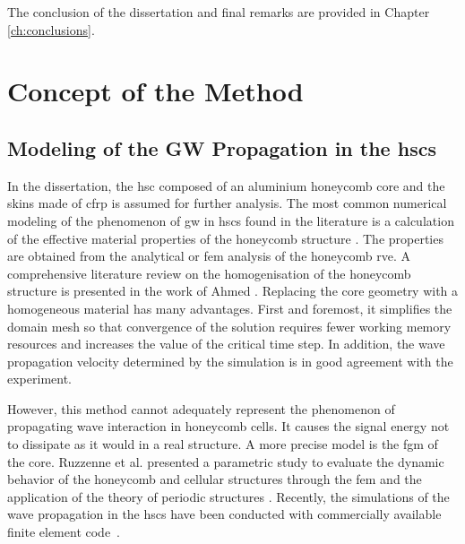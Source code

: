 \documentclass[11pt,a4paper,final]{report}
\begin{document}
The conclusion of the dissertation and final remarks are provided in Chapter \ref{ch:conclusions}.

\clearpage{}
\clearpage{}

\chapter[Concept of the Method]{Concept of the Method}
\label{ch:method}






\section{Modeling of the GW Propagation in the \acp{hsc}}
\label{sec:modelling}





In the dissertation, the \ac{hsc} composed of an aluminium honeycomb core and the skins made of \ac{cfrp} is assumed for further analysis.
The most common numerical modeling of the phenomenon of \ac{gw} in \acp{hsc} found in the literature is a calculation of the effective material properties of the honeycomb structure \cite{baid2015dispersion, mustapha2014leaky, qi2008ultrasonic,  shi1995derivation, sikdar2016guided}.
The properties are obtained from the analytical \cite{gibson1982mechanics, malek2015effective} or \ac{fem} \cite{catapano2014multi, chen2014analysis} analysis of the honeycomb \ac{rve}.
A comprehensive literature review on the homogenisation of the honeycomb structure is presented in the work of Ahmed \cite{ahmed2019homogenization}.
Replacing the core geometry with a homogeneous material has many advantages.
First and foremost, it simplifies the domain mesh so that convergence of the solution requires fewer working memory resources and increases the value of the critical time step.
In addition, the wave propagation velocity determined by the simulation is in good agreement with the experiment.

However, this method cannot adequately represent the phenomenon of propagating wave interaction in honeycomb cells.
It causes the signal energy not to dissipate as it would in a real structure.
A more precise model is the \ac{fgm} of the core. 
Ruzzenne et al. presented a parametric study to evaluate the dynamic behavior of the honeycomb and cellular structures through the \ac{fem} and the application of the theory of periodic structures \cite{ruzzene2003wave}.
Recently, the simulations of the wave propagation in the \acp{hsc} have been conducted with commercially available finite element code~\cite{song2009guided, hosseini2013numerical, tian2015wavenumber, zhao2018wave}.
\end{document}
